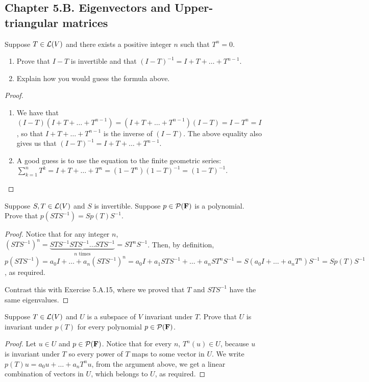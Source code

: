 \subsection*{Chapter 5.B. Eigenvectors and Upper-triangular matrices}


\begin{exercise}{1}
  Suppose $T\in\mathcal{L}(V)$ and there exists a positive integer $n$ such that $T^n=0$.
  \begin{enumerate}
      \item Prove that $I-T$ is invertible and that $(I-T)^{-1}=I+T+\dots+T^{n-1}$.
      \item Explain how you would guess the formula above.
  \end{enumerate}
\end{exercise}
\begin{proof}
 \begin{enumerate}
     \item We have that $(I-T)(I+T+\dots+T^{n-1})= (I+T+\dots+T^{n-1})(I-T)= I-T^n= I$, so that $I+T+\dots+T^{n-1}$ is the inverse of $(I-T)$. The above equality also gives us that $(I-T)^{-1}=I+T+\dots+T^{n-1}$.
     \item A good guess is to use the equation to the finite geometric series: $\sum_{k=1}^n T^k= I+T+\dots+T^{n}= (1-T^n)(1-T)^{-1}= (1-T)^{-1}$.
 \end{enumerate}
\end{proof}

\begin{exercise}{5}
  Suppose $S,T\in\mathcal{L}(V)$ and $S$ is invertible. Suppose $p\in\mathcal{P}(\mathbf{F})$ is a polynomial. Prove that $p(STS^{-1})=Sp(T)S^{-1}$.
\end{exercise}
\begin{proof}
 Notice that for any integer $n$, $(STS^{-1})^n= \underbrace{STS^{-1}STS^{-1}\dots STS^{-1}}_{\text{$n$ times}}= ST^nS^{-1}$. Then, by definition, $p(STS^{-1})= a_0I+\dots+a_n(STS^{-1})^n= a_0I+a_1STS^{-1}+\dots+a_nST^nS^{-1}= S(a_0I+\dots+a_nT^n)S^{-1}= Sp(T)S^{-1}$, as required.

 Contrast this with Exercise 5.A.15, where we proved that $T$ and $STS^{-1}$ have the same eigenvalues.
\end{proof}

\begin{exercise}{6}
  Suppose $T\in\mathcal{L}(V)$ and $U$ is a subspace of $V$ invariant under $T$. Prove that $U$ is invariant under $p(T)$ for every polynomial $p\in\mathcal{P}(\mathbf{F})$.
\end{exercise}
\begin{proof}
 Let $u\in U$ and $p\in\mathcal{P}(\mathbf{F})$. Notice that for every $n$, $T^n(u)\in U$, because $u$ is invariant under $T$ so every power of $T$ maps to some vector in $U$. We write $p(T)u=a_0u+\dots+a_nT^nu$, from the argument above, we get a linear combination of vectors in $U$, which belongs to $U$, as required.
\end{proof}

